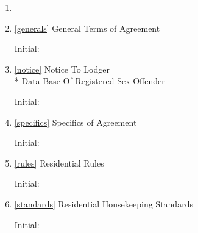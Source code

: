 \documentclass[12pt,letterpaper]{article}
\newcommand{\lodger}{Lodger}
\newcommand{\generals}{General Terms of Agreement}
\newcommand{\notice}{Notice To \lodger{}\\* Data Base Of Registered Sex Offender}
\newcommand{\specifics}{Specifics of Agreement}
\newcommand{\rules}{Residential Rules}
\newcommand{\standards}{Residential Housekeeping Standards}
\begin{document}
\begin{enumerate}
	\item 
	\item 
		\begin{minipage}[t]{0.55\textwidth}
			\ref{generals} \generals{}
		\end{minipage}
		\hfill
		\begin{minipage}[t]{0.35\textwidth}
				Initial:\hspace{0.2cm}\makebox[1.5cm]{\hrulefill}
		\end{minipage}
	\item 
		\begin{minipage}[t]{0.55\textwidth}
			\ref{notice} \notice{}
		\end{minipage}
		\hfill
		\begin{minipage}[t]{0.35\textwidth}
				Initial:\hspace{0.2cm}\makebox[1.5cm]{\hrulefill}
		\end{minipage}
	\item 
		\begin{minipage}[t]{0.55\textwidth}
			\ref{specifics} \specifics{}
		\end{minipage}
		\hfill
		\begin{minipage}[t]{0.35\textwidth}
				Initial:\hspace{0.2cm}\makebox[1.5cm]{\hrulefill}
		\end{minipage}
	\item 
		\begin{minipage}[t]{0.55\textwidth}
			\ref{rules} \rules{}
		\end{minipage}
		\hfill
		\begin{minipage}[t]{0.35\textwidth}
				Initial:\hspace{0.2cm}\makebox[1.5cm]{\hrulefill}
		\end{minipage}
	\item 
		\begin{minipage}[t]{0.55\textwidth}
			\ref{standards} \standards{}
		\end{minipage}
		\hfill
		\begin{minipage}[t]{0.35\textwidth}
				Initial:\hspace{0.2cm}\makebox[1.5cm]{\hrulefill}
		\end{minipage}
\end{enumerate}
\end{document}
